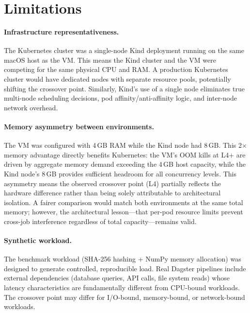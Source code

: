 
\section{Limitations}
\label{sec:limitations}

\paragraph{Infrastructure representativeness.}
The Kubernetes cluster was a single-node Kind deployment running on the same macOS host as the VM.
This means the Kind cluster and the VM were competing for the same physical CPU and RAM.
A production Kubernetes cluster would have dedicated nodes with separate resource pools, potentially shifting the crossover point.
Similarly, Kind's use of a single node eliminates true multi-node scheduling decisions, pod affinity/anti-affinity logic, and inter-node network overhead.

\paragraph{Memory asymmetry between environments.}
The VM was configured with 4\,GB RAM while the Kind node had 8\,GB.
This 2$\times$ memory advantage directly benefits Kubernetes: the VM's OOM kills at L4+ are driven by aggregate memory demand exceeding the 4\,GB host capacity, while the Kind node's 8\,GB provides sufficient headroom for all concurrency levels.
This asymmetry means the observed crossover point (L4) partially reflects the hardware difference rather than being solely attributable to architectural isolation.
A fairer comparison would match both environments at the same total memory; however, the architectural lesson---that per-pod resource limits prevent cross-job interference regardless of total capacity---remains valid.

\paragraph{Synthetic workload.}
The benchmark workload (SHA-256 hashing + NumPy memory allocation) was designed to generate controlled, reproducible load.
Real Dagster pipelines include external dependencies (database queries, API calls, file system reads) whose latency characteristics are fundamentally different from CPU-bound workloads.
The crossover point may differ for I/O-bound, memory-bound, or network-bound workloads.

